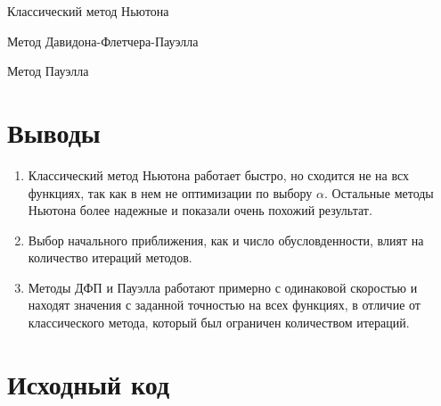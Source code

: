 Классический метод Ньютона\\

Метод Давидона-Флетчера-Пауэлла\\

Метод Пауэлла\\

\section{Выводы}

\begin{enumerate}
	\item Классический метод Ньютона работает быстро, но сходится не на всх функциях, так как в нем не оптимизации по выбору $\alpha$. Остальные методы Ньютона более надежные и показали очень похожий результат.
	\item Выбор начального приближения, как и число обусловденности, влият на количество итераций методов.
	\item Методы ДФП и Пауэлла работают примерно с одинаковой скоростью и находят значения с заданной точностью на всех функциях, в отличие от классического метода, который был ограничен количеством итераций.
\end{enumerate}


\section{Исходный код}







